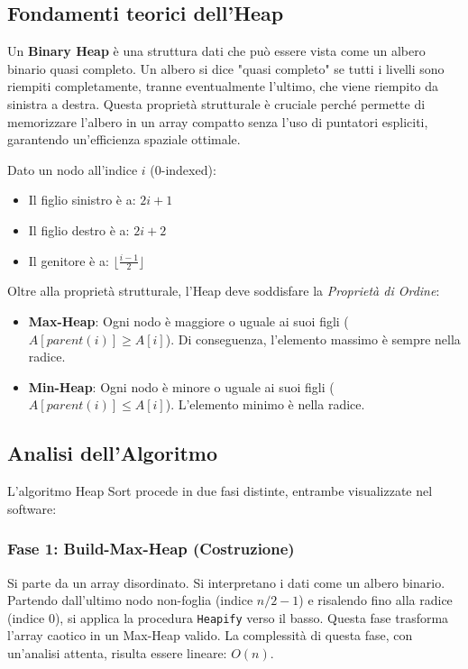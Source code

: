 \documentclass[openany]{theme/uniprthesis}
\begin{document}
\subsection{Fondamenti teorici dell'Heap}
Un \textbf{Binary Heap} è una struttura dati che può essere vista come un albero binario quasi completo. Un albero si dice "quasi completo" se tutti i livelli sono riempiti completamente, tranne eventualmente l'ultimo, che viene riempito da sinistra a destra.
Questa proprietà strutturale è cruciale perché permette di memorizzare l'albero in un array compatto senza l'uso di puntatori espliciti, garantendo un'efficienza spaziale ottimale.

Dato un nodo all'indice $i$ (0-indexed):
\begin{itemize}
    \item Il figlio sinistro è a: $2i + 1$
    \item Il figlio destro è a: $2i + 2$
    \item Il genitore è a: $\lfloor \frac{i-1}{2} \rfloor$
\end{itemize}

Oltre alla proprietà strutturale, l'Heap deve soddisfare la \textit{Proprietà di Ordine}:
\begin{itemize}
    \item \textbf{Max-Heap}: Ogni nodo è maggiore o uguale ai suoi figli ($A[parent(i)] \ge A[i]$). Di conseguenza, l'elemento massimo è sempre nella radice.
    \item \textbf{Min-Heap}: Ogni nodo è minore o uguale ai suoi figli ($A[parent(i)] \le A[i]$). L'elemento minimo è nella radice.
\end{itemize}

\subsection{Analisi dell'Algoritmo}
L'algoritmo Heap Sort procede in due fasi distinte, entrambe visualizzate nel software:

\subsubsection{Fase 1: Build-Max-Heap (Costruzione)}
Si parte da un array disordinato. Si interpretano i dati come un albero binario. Partendo dall'ultimo nodo non-foglia (indice $n/2 - 1$) e risalendo fino alla radice (indice 0), si applica la procedura \texttt{Heapify} verso il basso.
Questa fase trasforma l'array caotico in un Max-Heap valido.
La complessità di questa fase, con un'analisi attenta, risulta essere lineare: $O(n)$.
\end{document}
